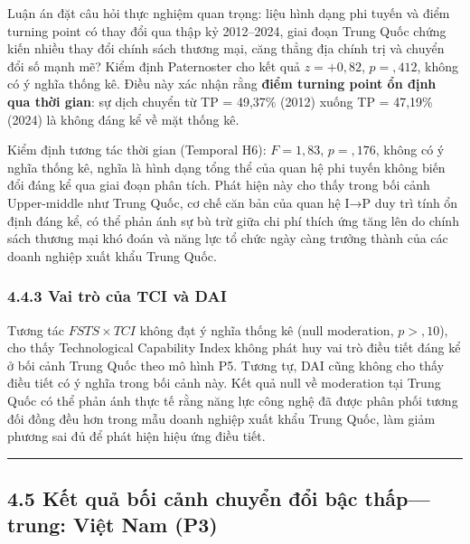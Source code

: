 \documentclass[12pt,a4paper]{article}
\begin{document}
Luận án đặt câu hỏi thực nghiệm quan trọng: liệu hình dạng phi tuyến và
điểm turning point có thay đổi qua thập kỷ 2012--2024, giai đoạn Trung
Quốc chứng kiến nhiều thay đổi chính sách thương mại, căng thẳng địa
chính trị và chuyển đổi số mạnh mẽ? Kiểm định Paternoster cho kết quả
\(z = +0{,}82\), \(p = {,}412\), không có ý nghĩa thống kê. Điều này xác
nhận rằng \textbf{điểm turning point ổn định qua thời gian}: sự dịch
chuyển từ TP = 49,37\% (2012) xuống TP = 47,19\% (2024) là không đáng kể
về mặt thống kê.

Kiểm định tương tác thời gian (Temporal H6): \(F = 1{,}83\),
\(p = {,}176\), không có ý nghĩa thống kê, nghĩa là hình dạng tổng thể
của quan hệ phi tuyến không biến đổi đáng kể qua giai đoạn phân tích.
Phát hiện này cho thấy trong bối cảnh Upper-middle như Trung Quốc, cơ
chế căn bản của quan hệ I→P duy trì tính ổn định đáng kể, có thể phản
ánh sự bù trừ giữa chi phí thích ứng tăng lên do chính sách thương mại
khó đoán và năng lực tổ chức ngày càng trưởng thành của các doanh nghiệp
xuất khẩu Trung Quốc.

\hypertarget{443-vai-truxf2-cux1ee7a-tci-vuxe0-dai}{%
\subsubsection{4.4.3 Vai trò của TCI và
DAI}\label{443-vai-truxf2-cux1ee7a-tci-vuxe0-dai}}

Tương tác \(FSTS \times TCI\) không đạt ý nghĩa thống kê (null
moderation, \(p > {,}10\)), cho thấy Technological Capability Index
không phát huy vai trò điều tiết đáng kể ở bối cảnh Trung Quốc theo mô
hình P5. Tương tự, DAI cũng không cho thấy điều tiết có ý nghĩa trong
bối cảnh này. Kết quả null về moderation tại Trung Quốc có thể phản ánh
thực tế rằng năng lực công nghệ đã được phân phối tương đối đồng đều hơn
trong mẫu doanh nghiệp xuất khẩu Trung Quốc, làm giảm phương sai đủ để
phát hiện hiệu ứng điều tiết.

\begin{center}\rule{0.5\linewidth}{0.5pt}\end{center}

\hypertarget{45-kux1ebft-quux1ea3-bux1ed1i-cux1ea3nh-chuyux1ec3n-ux111ux1ed5i-bux1eadc-thux1ea5ptrung-viux1ec7t-nam-p3}{%
\subsection{4.5 Kết quả bối cảnh chuyển đổi bậc thấp---trung: Việt Nam
(P3)}\label{45-kux1ebft-quux1ea3-bux1ed1i-cux1ea3nh-chuyux1ec3n-ux111ux1ed5i-bux1eadc-thux1ea5ptrung-viux1ec7t-nam-p3}}
\end{document}
